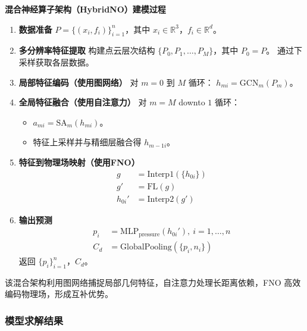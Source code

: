\documentclass{MMCStyle}
\begin{document}
    \item \textbf{混合神经算子架构（HybridNO）建模过程}
    \begin{enumerate}
        \item \textbf{数据准备}
        \(P = \{(x_i, f_i)\}_{i = 1}^n\)，其中 \(x_i \in \mathbb{R}^3\)，\(f_i \in \mathbb{R}^d\)。
        \item \textbf{多分辨率特征提取}
        构建点云层次结构 \(\{P_0, P_1, \ldots, P_M\}\)，其中 \(P_0 = P\)。
        通过下采样获取各层数据。
        \item \textbf{局部特征编码（使用图网络）}
        对 \(m = 0\) 到 \(M\) 循环：
        \(h_{m i} = \text{GCN}_m(P_m)\)。
        \item \textbf{全局特征融合（使用自注意力）}
        对 \(m = M\) downto \(1\) 循环：
        \begin{itemize}
            \item \(a_{m i} = \text{SA}_m(h_{m i})\)。
            \item 特征上采样并与精细层融合得 \(h_{m - 1 i}\)。
        \end{itemize}
        \item \textbf{特征到物理场映射（使用FNO）}
        \begin{align*}
            g &= \text{Interp1}(\{h_{0 i}\})\\
            g' &= \text{FL}(g)\\
            h_{0 i}' &= \text{Interp2}(g')
        \end{align*}
        \item \textbf{输出预测}
        \begin{align*}
            p_i &= \text{MLP}_{\text{pressure}}(h_{0 i}'),\ i = 1,\ldots,n\\
            C_d &= \text{GlobalPooling}(\{p_i, n_i\})
        \end{align*}
        返回 \(\{p_i\}_{i = 1}^n\)，\(C_d\)。
    \end{enumerate}


该混合架构利用图网络捕捉局部几何特征，自注意力处理长距离依赖，FNO 高效编码物理场，形成互补优势。  

\subsubsection{模型求解结果}
\end{document}
